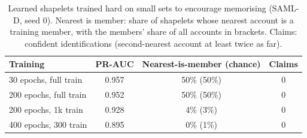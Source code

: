 \begin{table}[H]
\caption{Learned shapelets trained hard on small sets to encourage memorising (SAML-D, seed 0). Nearest is member: share of shapelets whose nearest account is a training member, with the members' share of all accounts in brackets. Claims: confident identifications (second-nearest account at least twice as far).}
\label{tab:probe}
\small\setlength{\tabcolsep}{3pt}
\centering
\begin{tabular}{lccc}
\toprule
Training & PR-AUC & Nearest-is-member (chance) & Claims \\
\midrule
30 epochs, full train & 0.957 & 50\% (50\%) & 0 \\
200 epochs, full train & 0.952 & 50\% (50\%) & 0 \\
200 epochs, 1k train & 0.928 & 4\% (3\%) & 0 \\
400 epochs, 300 train & 0.895 & 0\% (1\%) & 0 \\
\bottomrule\end{tabular}\end{table}

